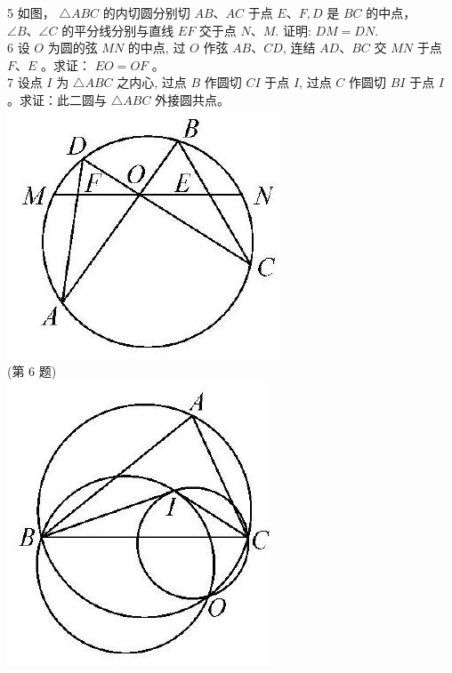 \documentclass[10pt]{article}
\begin{document}
5 如图， $\triangle A B C$ 的内切圆分别切 $A B 、 A C$ 于点 $E 、 F, D$ 是 $B C$ 的中点， $\angle B 、 \angle C$ 的平分线分别与直线 $E F$ 交于点 $N 、 M$. 证明: $D M=D N$.\\
6 设 $O$ 为圆的弦 $M N$ 的中点, 过 $O$ 作弦 $A B 、 C D$, 连结 $A D 、 B C$ 交 $M N$ 于点 $F 、 E$ 。求证： $E O=O F$ 。\\
7 设点 $I$ 为 $\triangle A B C$ 之内心, 过点 $B$ 作圆切 $C I$ 于点 $I$, 过点 $C$ 作圆切 $B I$ 于点 $I$ 。求证：此二圆与 $\triangle A B C$ 外接圆共点。\\
\includegraphics[max width=\textwidth, center]{2024_10_30_66b8e5e701da2093c133g-050(1)}\\
(第 6 题)\\
\includegraphics[max width=\textwidth, center]{2024_10_30_66b8e5e701da2093c133g-050(3)}\\
\end{document}
